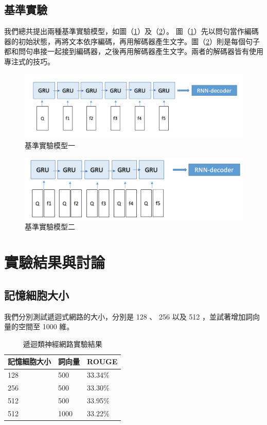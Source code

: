 \subsection{基準實驗}
我們總共提出兩種基準實驗模型，如圖（\ref{fig:baseline1}）及（\ref{fig:baseline2}）。
圖（\ref{fig:baseline1}）先以問句當作編碼器的初始狀態，再將文本依序編碼，再用解碼器產生文字。圖（\ref{fig:baseline2}）則是每個句子都和問句串接一起接到編碼器，之後再用解碼器產生文字。兩者的解碼器皆有使用 \cite{bahdanau2014neural} 專注式的技巧。
\begin{figure}[h]
    \centering
    \includegraphics[scale=0.54]{images/chap3_baseline1.png}
    \caption{基準實驗模型一}\label{fig:baseline1}
\end{figure}
\begin{figure}[h]
    \centering
    \includegraphics[scale=0.54]{images/chap3_baseline2.png}
    \caption{基準實驗模型二}\label{fig:baseline2}
\end{figure}

\section{實驗結果與討論}
\subsection{記憶細胞大小}
我們分別測試遞迴式網路的大小，分別是 128 、 256 以及 512 ，並試著增加詞向量的空間至 1000 維。
\begin{table}
    \caption{遞迴類神經網路實驗結果}
    \label{table:RNNCell_size}
    \centering
    \begin{tabular}{|l|l|l|}
        \hline
        記憶細胞大小&詞向量 & ROUGE\\
        \hline
        128 & 500 & 33.34\% \\ %
        \hline
        256 & 500 & 33.30\% \\
        \hline
        512 & 500 & 33.95\% \\
        \hline
        512 & 1000 & 33.22\% \\
        \hline
    \end{tabular}
\end{table}
